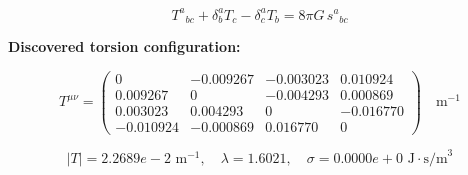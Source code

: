 
\begin{equation}
  T^a{}_{bc} + \delta^a_b T_c - \delta^a_c T_b = 8\pi G \, s^a{}_{bc}
\end{equation}

\textbf{Discovered torsion configuration:}

\begin{equation}
  T^{\mu\nu} = \begin{pmatrix}
    0 & -0.009267 & -0.003023 & 0.010924 \\
    0.009267 & 0 & -0.004293 & 0.000869 \\
    0.003023 & 0.004293 & 0 & -0.016770 \\
    -0.010924 & -0.000869 & 0.016770 & 0
  \end{pmatrix} \quad \text{m}^{-1}
\end{equation}

\begin{equation}
  |T| = 2.2689e-2 \text{ m}^{-1}, \quad
  \lambda = 1.6021, \quad
  \sigma = 0.0000e+0 \text{ J}\cdot\text{s/m}^3
\end{equation}